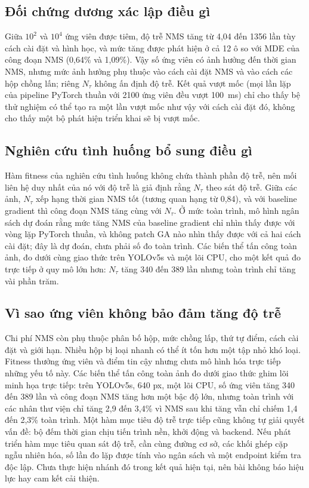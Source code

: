 \documentclass[a4paper,fleqn]{cas-dc}
\newcommand{\Ntau}{N_{\tau}}
\begin{document}
\subsection{Đối chứng dương xác lập điều gì}
Giữa $10^2$ và $10^4$ ứng viên được tiêm, độ trễ NMS tăng từ 4,04 đến 1356 lần tùy cách cài đặt và hình học, và mức tăng được phát hiện ở cả 12 ô so với MDE của công đoạn NMS (0,64\% và 1,09\%). Vậy số ứng viên có ảnh hưởng đến thời gian NMS, nhưng mức ảnh hưởng phụ thuộc vào cách cài đặt NMS và vào cách các hộp chồng lấn; riêng $\Ntau$ không ấn định độ trễ. Kết quả vượt mốc (mọi lần lặp của pipeline PyTorch thuần với 2100 ứng viên đều vượt 100~ms) chỉ cho thấy bệ thử nghiệm có thể tạo ra một lần vượt mốc như vậy với cách cài đặt đó, không cho thấy một bộ phát hiện triển khai sẽ bị vượt mốc.

\subsection{Nghiên cứu tình huống bổ sung điều gì}
Hàm fitness của nghiên cứu tình huống không chứa thành phần độ trễ, nên mối liên hệ duy nhất của nó với độ trễ là giả định rằng $\Ntau$ theo sát độ trễ. Giữa các ảnh, $\Ntau$ xếp hạng thời gian NMS tốt (tương quan hạng từ 0,84), và với baseline gradient thì công đoạn NMS tăng cùng với $\Ntau$. Ở mức toàn trình, mô hình ngân sách dự đoán rằng mức tăng NMS của baseline gradient chỉ nhìn thấy được với vòng lặp PyTorch thuần, và không patch GA nào nhìn thấy được với cả hai cách cài đặt; đây là dự đoán, chưa phải số đo toàn trình. Các biến thể tấn công toàn ảnh, đo dưới cùng giao thức trên YOLOv5s và một lõi CPU, cho một kết quả đo trực tiếp ở quy mô lớn hơn: $\Ntau$ tăng 340 đến 389 lần nhưng toàn trình chỉ tăng vài phần trăm.

\subsection{Vì sao ứng viên không bảo đảm tăng độ trễ}
Chi phí NMS còn phụ thuộc phân bố hộp, mức chồng lấp, thứ tự điểm, cách cài đặt và giới hạn. Nhiều hộp bị loại nhanh có thể ít tốn hơn một tập nhỏ khó loại. Fitness thưởng ứng viên và điểm tin cậy nhưng chưa mô hình hóa trực tiếp những yếu tố này. Các biến thể tấn công toàn ảnh đo dưới giao thức ghim lõi minh họa trực tiếp: trên YOLOv5s, 640 px, một lõi CPU, số ứng viên tăng 340 đến 389 lần và công đoạn NMS tăng hơn một bậc độ lớn, nhưng toàn trình với các nhân thư viện chỉ tăng 2,9 đến 3,4\% vì NMS sau khi tăng vẫn chỉ chiếm 1,4 đến 2,3\% toàn trình. Một hàm mục tiêu độ trễ trực tiếp cũng không tự giải quyết vấn đề: bộ đếm thời gian chịu tiến trình nền, khởi động và backend. Nếu phát triển hàm mục tiêu quan sát độ trễ, cần cùng đường cơ sở, các khối ghép cặp ngẫu nhiên hóa, số lần đo lặp được tính vào ngân sách và một endpoint kiểm tra độc lập. Chưa thực hiện nhánh đó trong kết quả hiện tại, nên bài không báo hiệu lực hay cam kết cải thiện.
\end{document}
